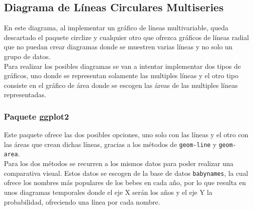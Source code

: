 \documentclass{article}\usepackage[]{graphicx}\usepackage[]{color}
\begin{document}
\subsection{Diagrama de L\'ineas Circulares Multiseries}\label{ssec:lineascircularmultiseries}
En este diagrama, al implementar un gr\'afico de l\'ineas multivariable, queda descartado el paquete circlize y cualquier otro que ofrezca gr\'aficos de l\'ineas radial que no puedan crear diagramas donde se muestren varias l\'ineas y no solo un grupo de datos.~\\
Para realizar los posibles diagramas se van a intentar implementar dos tipos de gr\'aficos, uno donde se representan solamente las multiples l\'ineas y el otro tipo consiste en el gr\'afico de \'area donde se escogen las \'areas de las multiples l\'ineas representadas.
\subsubsection{Paquete ggplot2}
Este paquete %
ofrece las dos posibles opciones, uno solo con las l\'ineas y el otro con las \'areas que crean dichas l\'ineas, gracias a los m\'etodos de \texttt{geom-line} y \texttt{geom-area}.~\\
Para los dos m\'etodos se recurren a los mismos datos para poder realizar una comparativa visual. Estos datos se escogen de la base de datos \texttt{babynames}, la cual ofrece los nombres m\'as populares de los bebes en cada a\~no, por lo que resulta en unos diagramas temporales donde el eje X ser\'an los a\~nos y el eje Y la probabilidad, ofreciendo una l\'inea por cada nombre.
\end{document}
